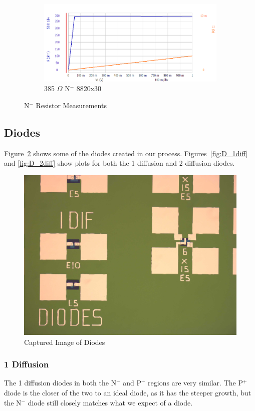 \documentclass[letter,12pt]{article}
\begin{document}
\begin{figure}[h!]
\begin{subfigure}[b]{.45\textwidth}
					\includegraphics[width=\textwidth]{./Images/Probe_Test/R_Tub_8820x30.png}
					\caption{385 $\Omega$ N$^-$ 8820x30}
				\end{subfigure}
				\caption{N$^-$ Resistor Measurements}
				\label{fig:R_Tub_Measurements}
			\end{figure}
	
	\FloatBarrier		
	\subsection{Diodes}	
		Figure~\ref{fig:D_Image} shows some of the diodes created in our process.  Figures~\ref{fig:D_1diff} and \ref{fig:D_2diff} show plots for both the 1 diffusion and 2 diffusion diodes.
		
		\begin{figure}[h!]
			\centering
			\includegraphics[width=.45\textwidth]{./Images/19_Nov_Diodes.jpg}
			\caption{Captured Image of Diodes}
			\label{fig:D_Image}
		\end{figure}
	
		\subsubsection{1 Diffusion}
			\FloatBarrier
			The 1 diffusion diodes in both the N$^-$ and P$^+$ regions are very similar.  The P$^+$ diode is the closer of the two to an ideal diode, as it has the steeper growth, but the N$^-$ diode still closely matches what we expect of a diode.
			
\end{document}
